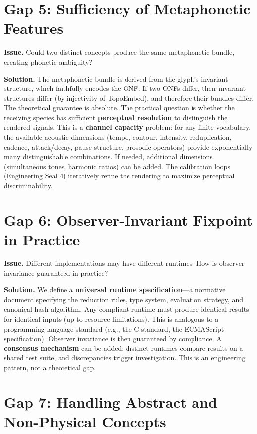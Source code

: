 \documentclass[12pt, letterpaper]{book}
\begin{document}
\section{Gap 5: Sufficiency of Metaphonetic Features}

\textbf{Issue.} Could two distinct concepts produce the same metaphonetic bundle, creating phonetic ambiguity?

\textbf{Solution.} The metaphonetic bundle is derived from the glyph's invariant structure, which faithfully encodes the ONF. If two ONFs differ, their invariant structures differ (by injectivity of TopoEmbed), and therefore their bundles differ. The theoretical guarantee is absolute. The practical question is whether the receiving species has sufficient \textbf{perceptual resolution} to distinguish the rendered signals. This is a \textbf{channel capacity} problem: for any finite vocabulary, the available acoustic dimensions (tempo, contour, intensity, reduplication, cadence, attack/decay, pause structure, prosodic operators) provide exponentially many distinguishable combinations. If needed, additional dimensions (simultaneous tones, harmonic ratios) can be added. The calibration loops (Engineering Seal 4) iteratively refine the rendering to maximize perceptual discriminability.

\section{Gap 6: Observer-Invariant Fixpoint in Practice}

\textbf{Issue.} Different implementations may have different runtimes. How is observer invariance guaranteed in practice?

\textbf{Solution.} We define a \textbf{universal runtime specification}---a normative document specifying the reduction rules, type system, evaluation strategy, and canonical hash algorithm. Any compliant runtime must produce identical results for identical inputs (up to resource limitations). This is analogous to a programming language standard (e.g., the C standard, the ECMAScript specification). Observer invariance is then guaranteed by compliance. A \textbf{consensus mechanism} can be added: distinct runtimes compare results on a shared test suite, and discrepancies trigger investigation. This is an engineering pattern, not a theoretical gap.

\section{Gap 7: Handling Abstract and Non-Physical Concepts}
\end{document}
